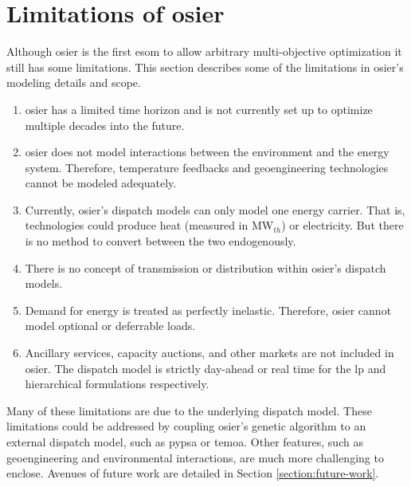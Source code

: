 \section{Limitations of \ac{osier}}

Although \ac{osier} is the first \ac{esom} to allow arbitrary multi-objective
optimization it still has some limitations. This section describes some of the limitations in \ac{osier}'s modeling details
and scope.

\begin{enumerate}
    \item \ac{osier} has a limited time horizon and is not currently set up to
    optimize multiple decades into the future.
    \item \ac{osier} does not model interactions between the environment and the
    energy system. Therefore, temperature feedbacks and geoengineering
    technologies cannot be modeled adequately. 
    \item Currently, \ac{osier}'s dispatch models can only model one energy carrier. That is, technologies
    could produce heat (measured in MW$_{th}$) or electricity. But there is no method
    to convert between the two endogenously.
    \item There is no concept of transmission or distribution within \ac{osier}'s dispatch
    models. 
    \item Demand for energy is treated as perfectly inelastic. Therefore, \ac{osier} cannot model 
    optional or deferrable loads.
    \item Ancillary services, capacity auctions, and other markets are not included in \ac{osier}. The dispatch
    model is strictly day-ahead or real time for the \ac{lp} and hierarchical formulations respectively.
\end{enumerate}

Many of these limitations are due to the underlying dispatch model. These limitations could be addressed 
by coupling \ac{osier}'s genetic algorithm to an external dispatch model, such as \ac{pypsa} or \ac{temoa}.
Other features, such as geoengineering and environmental interactions, are much more challenging to enclose.
Avenues of future work are detailed in Section \ref{section:future-work}.

